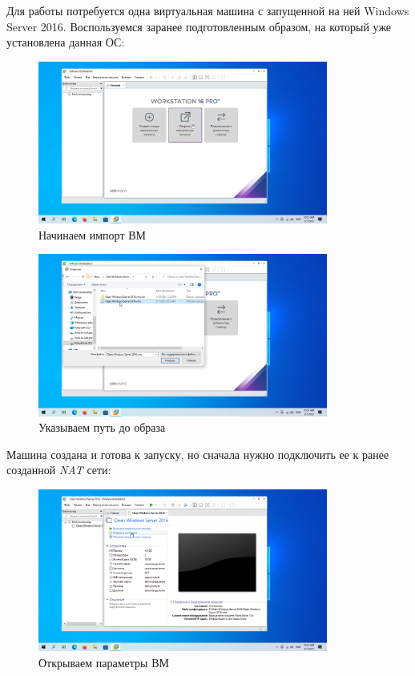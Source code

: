 \documentclass[a4paper]{article}
\begin{document}
  Для работы потребуется одна виртуальная машина с запущенной на ней
  Windows Server 2016. Воспользуемся заранее подготовленным образом,
  на который уже установлена данная ОС:

  \begin{figure}[H]
    \centering
    \includegraphics[width=0.85\textwidth]{9_0008}
    \caption{Начинаем импорт ВМ}
    \label{img:0008}
  \end{figure}

  \begin{figure}[H]
    \centering
    \includegraphics[width=0.85\textwidth]{9_0009}
    \caption{Указываем путь до образа}
    \label{img:0009}
  \end{figure}

  Машина создана и готова к запуску, но сначала нужно подключить ее к ранее созданной
  \textit{NAT} сети:

  \begin{figure}[H]
    \centering
    \includegraphics[width=0.85\textwidth]{9_0010}
    \caption{Открываем параметры ВМ}
    \label{img:0010}
  \end{figure}
\end{document}
